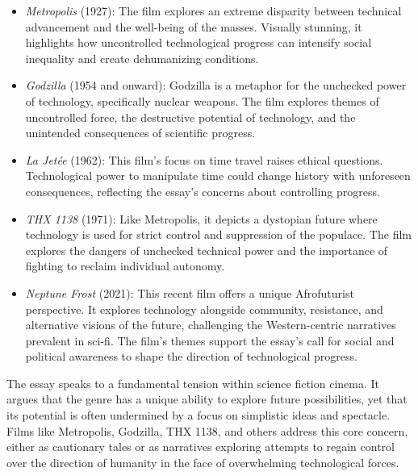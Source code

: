 \documentclass[11pt,fleqn]{book}
\begin{document}
\begin{itemize}
\item \textit{Metropolis} (1927): The film explores an extreme disparity between technical advancement and the well-being of the masses. Visually stunning, it highlights how uncontrolled technological progress can intensify social inequality and create dehumanizing conditions. 

\item \textit{Godzilla} (1954 and onward): Godzilla is a metaphor for the unchecked power of technology, specifically nuclear weapons. The film explores themes of uncontrolled force, the destructive potential of technology, and the unintended consequences of scientific progress. 

\item \textit{La Jetée} (1962): This film's focus on time travel raises ethical questions. Technological power to manipulate time could change history with unforeseen consequences, reflecting the essay's concerns about controlling progress.

\item \textit{THX 1138} (1971):  Like Metropolis, it depicts a dystopian future where technology is used for strict control and suppression of the populace. The film explores the dangers of unchecked technical power and the importance of fighting to reclaim individual autonomy. 

\item \textit{Neptune Frost} (2021): This recent film offers a unique Afrofuturist perspective. It explores technology alongside community, resistance, and alternative visions of the future, challenging the Western-centric narratives prevalent in sci-fi. The film's themes support the essay's call for social and political awareness to shape the direction of technological progress.
\end{itemize}

\vspace{5pt}
The essay speaks to a fundamental tension within science fiction cinema. It argues that the genre has a unique ability to explore future possibilities, yet that its potential is often undermined by a focus on simplistic ideas and spectacle. Films like Metropolis, Godzilla, THX 1138, and others address this core concern, either as cautionary tales or as narratives exploring attempts to regain control over the direction of humanity in the face of overwhelming technological forces. 
\end{document}
